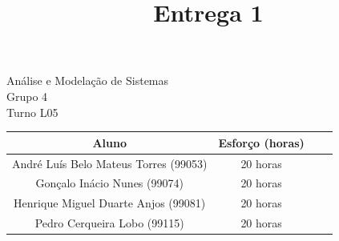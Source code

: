 \documentclass{article}
\title{{\Huge Entrega 1}}
\author{}
\date{}
\begin{document}
\maketitle
\begin{center}
	{\LARGE Análise e Modelação de Sistemas}\\
	\vspace{8mm}
	{\LARGE Grupo 4}\\
	\vspace{8mm}
	{\LARGE Turno L05}\\

	\vspace{7cm}

	\begin{tabular}{|c|c|c|c|} \hline
		\textbf{Aluno}                        & \textbf{Esforço (horas)} \\ \hline
		André Luís Belo Mateus Torres (99053) & 20 horas                 \\ \hline
		Gonçalo Inácio Nunes (99074)          & 20 horas                 \\ \hline
		Henrique Miguel Duarte Anjos (99081)  & 20 horas                 \\ \hline
		Pedro Cerqueira Lobo (99115)          & 20 horas                 \\ \hline
	\end{tabular}

\end{center}

\pagebreak
\end{document}
